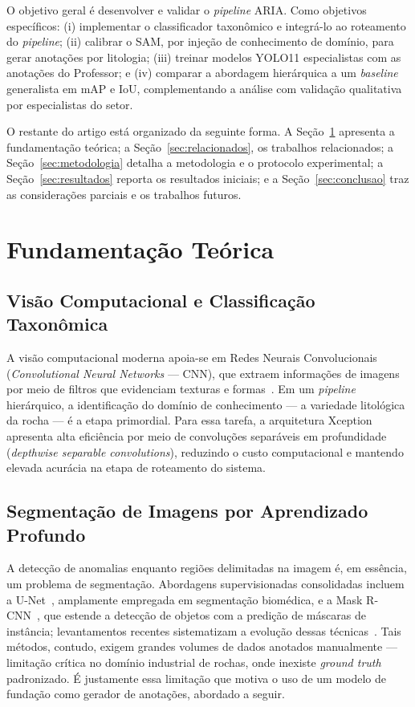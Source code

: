 \documentclass[12pt]{article}
\begin{document}
O objetivo geral é desenvolver e validar o \textit{pipeline} ARIA. Como objetivos específicos: (i) implementar o classificador taxonômico e integrá-lo ao roteamento do \textit{pipeline}; (ii) calibrar o SAM, por injeção de conhecimento de domínio, para gerar anotações por litologia; (iii) treinar modelos YOLO11 especialistas com as anotações do Professor; e (iv) comparar a abordagem hierárquica a um \textit{baseline} generalista em mAP e IoU, complementando a análise com validação qualitativa por especialistas do setor.

O restante do artigo está organizado da seguinte forma. A Seção~\ref{sec:fundamentacao} apresenta a fundamentação teórica; a Seção~\ref{sec:relacionados}, os trabalhos relacionados; a Seção~\ref{sec:metodologia} detalha a metodologia e o protocolo experimental; a Seção~\ref{sec:resultados} reporta os resultados iniciais; e a Seção~\ref{sec:conclusao} traz as considerações parciais e os trabalhos futuros.

\section{Fundamentação Teórica}
\label{sec:fundamentacao}

\subsection{Visão Computacional e Classificação Taxonômica}

A visão computacional moderna apoia-se em Redes Neurais Convolucionais (\textit{Convolutional Neural Networks} --- CNN), que extraem informações de imagens por meio de filtros que evidenciam texturas e formas~\cite{deeplearning_lecun2015}. Em um \textit{pipeline} hierárquico, a identificação do domínio de conhecimento --- a variedade litológica da rocha --- é a etapa primordial. Para essa tarefa, a arquitetura Xception~\cite{xception_chollet2017} apresenta alta eficiência por meio de convoluções separáveis em profundidade (\textit{depthwise separable convolutions}), reduzindo o custo computacional e mantendo elevada acurácia na etapa de roteamento do sistema.

\subsection{Segmentação de Imagens por Aprendizado Profundo}

A detecção de anomalias enquanto regiões delimitadas na imagem é, em essência, um problema de segmentação. Abordagens supervisionadas consolidadas incluem a U-Net~\cite{unet_ronneberger2015}, amplamente empregada em segmentação biomédica, e a Mask R-CNN~\cite{maskrcnn_he2017}, que estende a detecção de objetos com a predição de máscaras de instância; levantamentos recentes sistematizam a evolução dessas técnicas~\cite{segsurvey_minaee2021}. Tais métodos, contudo, exigem grandes volumes de dados anotados manualmente --- limitação crítica no domínio industrial de rochas, onde inexiste \textit{ground truth} padronizado. É justamente essa limitação que motiva o uso de um modelo de fundação como gerador de anotações, abordado a seguir.
\end{document}
